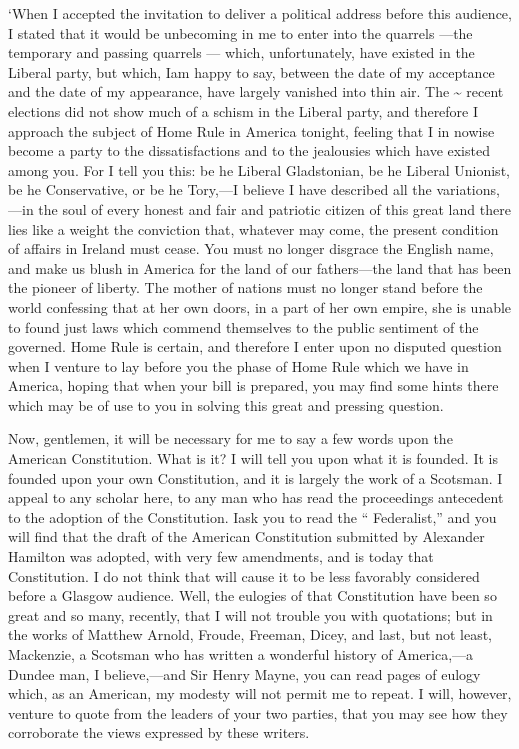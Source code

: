 \documentclass[11pt,openany]{book}
\begin{document}
`When I accepted the invitation to deliver a political address before this audience, I stated that it would be unbecoming in me to enter into the quarrels ---the temporary and passing quarrels --- which, unfortunately, have existed in the Liberal party, but which, Iam happy to say, between the date of my acceptance and the date of my appearance, have largely vanished into thin air. The \textasciitilde{} recent elections did not show much of a schism in the Liberal party, and therefore I approach the subject of Home Rule in America tonight, feeling that I in nowise become a party to the dissatisfactions and to the jealousies which have existed among you. For I tell you this: be he Liberal Gladstonian, be he Liberal Unionist, be he Conservative, or be he Tory,---I believe I have described all the variations,---in the soul of every honest and fair and patriotic citizen of this great land there lies like a weight the conviction that, whatever may come, the present condition of affairs in Ireland must cease. You must no longer disgrace the English name, and make us blush in America for the land of our fathers---the land that has been the pioneer of liberty. The mother of nations must no longer stand before the world confessing that at her own doors, in a part of her own empire, she is unable to found just laws which commend themselves to the public sentiment of the governed. Home Rule is certain, and therefore I enter upon no disputed question when I venture to lay before you the phase of Home Rule which we have in America, hoping that when your bill is prepared, you may find some hints there which may be of use to you in solving this great and pressing question.

Now, gentlemen, it will be necessary for me to say a few words upon the American Constitution. What is it? I will tell you upon what it is founded. It is founded upon your own Constitution, and it is largely the work of a Scotsman. I appeal to any scholar here, to any man who has read the proceedings antecedent to the adoption of the Constitution. Iask you to read the `` Federalist,'' and you will find that the draft of the American Constitution submitted by Alexander Hamilton was adopted, with very few amendments, and is today that Constitution. I do not think that will cause it to be less favorably considered before a Glasgow audience. Well, the eulogies of that Constitution have been so great and so many, recently, that I will not trouble you with quotations; but in the works of Matthew Arnold, Froude, Freeman, Dicey, and last, but not least, Mackenzie, a Scotsman who has written a wonderful history of America,---a Dundee man, I believe,---and Sir Henry Mayne, you can read pages of eulogy which, as an American, my modesty will not permit me to repeat. I will, however, venture to quote from the leaders of your two parties, that you may see how they corroborate the views expressed by these writers.
\end{document}
